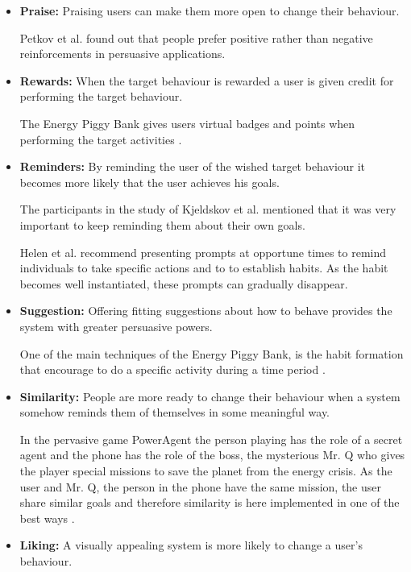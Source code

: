 \begin{itemize}
	\item \textbf{Praise:}
	Praising users can make them more open to change their behaviour.
	
	Petkov et al. \cite{petkov2012personalised} found out that people prefer positive rather than negative reinforcements	in persuasive applications.
	\item \textbf{Rewards:}
	When the target behaviour is rewarded a user is given credit for performing the target behaviour.
	
	The Energy Piggy Bank gives users virtual badges and points when performing the target activities \cite{Bjorn1165339}. 
	\item \textbf{Reminders:}
	By reminding the user of the wished target behaviour it becomes more likely that the user achieves his goals.
	
	The participants in the study of Kjeldskov et al. \cite{kjeldskov2012using} mentioned that it was very important to keep reminding them about their own goals.
	
	Helen et al. \cite{he2010one} recommend presenting prompts at opportune times to remind individuals to take specific actions and to to establish habits. As the habit becomes well instantiated, these prompts can gradually disappear.	
	
	\item \textbf{Suggestion:}
	Offering fitting suggestions about how to behave provides the system with greater persuasive powers.
	
	One of the main techniques of the Energy Piggy Bank, is the habit formation that encourage to do a specific activity during a time period \cite{Bjorn1165339}.
	\item \textbf{Similarity:}
	People are more ready to change their behaviour when a system somehow reminds them of themselves in some meaningful way.
		
	In the pervasive game PowerAgent the person playing has the role of a secret agent and the phone has the role of the boss, the mysterious Mr. Q who gives the player special missions to save the planet from the energy crisis. As the user and Mr. Q, the person in the phone have the same mission, the user share similar goals and therefore similarity is here implemented in one of the best ways \cite{bang2007promoting}.

	\item \textbf{Liking:}
	A visually appealing system is more likely to change a user's behaviour.
	

\end{itemize}
